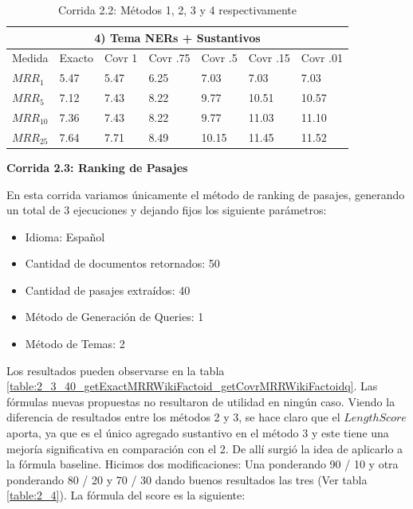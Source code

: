 \begin{table}[H]
\begin{center}
\medskip

\begin{tabular}{|l | l | l | l | l | l | l |}
\hline
\multicolumn{7}{|c|}{4) Tema NERs + Sustantivos}  \\ \hline
Medida & Exacto & Covr 1 & Covr .75 & Covr .5 & Covr .15 & Covr .01 \\ \hline
$MRR_{1}$ & 5.47 & 5.47 & 6.25 & 7.03 & 7.03 & 7.03  \\ \hline
$MRR_{5}$ & 7.12 & 7.43 & 8.22 & 9.77 & 10.51 & 10.57  \\ \hline
$MRR_{10}$ & 7.36 & 7.43 & 8.22 & 9.77 & 11.03 & 11.10  \\ \hline
$MRR_{25}$ & 7.64 & 7.71 & 8.49 & 10.15 & 11.45 & 11.52  \\ \hline
\end{tabular}




\caption{Corrida 2.2: Métodos 1, 2, 3 y 4 respectivamente}
\label{table:2_2_40_getExactMRRWikiFactoid_getCovrMRRWikiFactoidy}
\end{center}
\end{table}


\textbf{Corrida 2.3: Ranking de Pasajes}\newline

En esta corrida variamos únicamente el método de ranking de pasajes, generando un total de 3 ejecuciones y dejando fijos los siguiente parámetros: \newline


\begin{itemize}
  \item Idioma: Español
  \item Cantidad de documentos retornados: 50
  \item Cantidad de pasajes extraídos: 40
  \item Método de Generación de Queries: 1
  \item Método de Temas: 2
\end{itemize}

Los resultados pueden observarse en la tabla \ref{table:2_3_40_getExactMRRWikiFactoid_getCovrMRRWikiFactoidq}. Las fórmulas nuevas propuestas no resultaron de utilidad en ningún caso. Viendo la diferencia de resultados entre los métodos 2 y 3, se hace claro que el $LengthScore$ aporta, ya que es el único agregado sustantivo en el método 3 y este tiene una mejoría significativa en comparación con el 2. De allí surgió la idea de aplicarlo a la fórmula baseline.
Hicimos dos modificaciones: Una ponderando 90 / 10 y otra ponderando 80 / 20 y 70 / 30 dando buenos resultados las tres (Ver tabla \ref{table:2_4}).
La fórmula del score es la siguiente:

